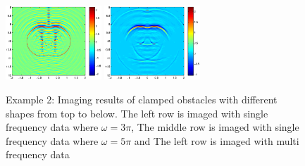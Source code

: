 \documentclass[cjk,8pt]{beamer}
\newcommand{\om}{\omega}
\begin{document}
\begin{CJK*}{GBK}{kai}
\begin{frame}
\begin{figure}[h]
	\includegraphics[width=0.32\textwidth]{./graphic/peanut_5pi.eps}
	\includegraphics[width=0.32\textwidth]{./graphic/peanut.eps}
\caption{Example 2: Imaging results of clamped obstacles
		with different shapes from top to below. The left row is imaged with single frequency data where $\om=3\pi$, The middle row is imaged with single frequency data where $\om=5\pi$ and The left row is imaged with multi frequency data}
  \label{fig_wgout_ex2}
\end{figure}
\end{frame}


\end{CJK*}
\end{document}

